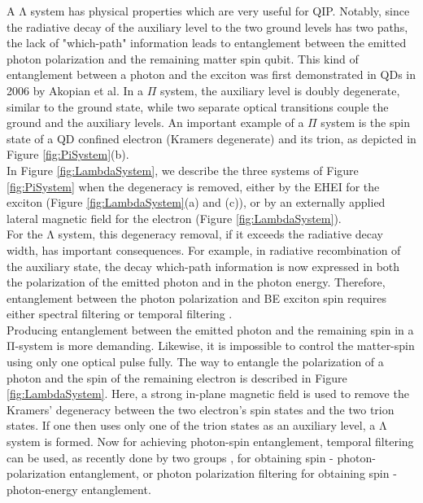 A Λ system has physical properties which are very useful for QIP. Notably, since the radiative decay of the auxiliary level to the two ground levels has two paths, the lack of "which-path" information leads to entanglement between the emitted photon polarization and the remaining matter spin qubit. This kind of entanglement between a photon and the exciton was first demonstrated in QDs in 2006 by Akopian et al. \cite{Akopian2006}
In a $\Pi$ system, the auxiliary level is doubly degenerate, similar to the ground state, while two separate optical transitions couple the ground and the auxiliary levels. An important example of a $\Pi$ system is the spin state of a QD confined electron (Kramers degenerate) and its trion, as depicted in Figure \ref{fig:PiSystem}(b).\\
In Figure \ref{fig:LambdaSystem}, we describe the three systems of Figure \ref{fig:PiSystem} when the degeneracy is removed, either by the EHEI for the exciton (Figure \ref{fig:LambdaSystem}(a) and
(c)), or by an externally applied lateral magnetic field for the electron (Figure \ref{fig:LambdaSystem}).\\
For the Λ system, this degeneracy removal, if it exceeds the radiative decay width, has important consequences. For example, in radiative recombination of the auxiliary state, the decay  which-path information is now expressed in both the polarization of the emitted photon and in the photon energy. Therefore, entanglement between the photon polarization and BE exciton spin requires either spectral filtering \cite{Hafenbrak2007} or temporal filtering \cite{Akopian2006}.\\
Producing entanglement between the emitted photon and the remaining spin in a Π-system is more demanding. Likewise, it is impossible to control the matter-spin using only one optical pulse fully. The way to entangle the polarization of a photon and the spin of the remaining electron is described in Figure \ref{fig:LambdaSystem}. Here, a strong in-plane magnetic field is used to remove the Kramers' degeneracy between the two electron's spin states and the two trion states. If one then uses only one of the trion states as an auxiliary level, a Λ system is formed. Now for achieving photon-spin entanglement, temporal filtering can be used, as recently done by two groups \cite{DeGreve2012} \cite{Schaibley2013}, for obtaining spin - photon-polarization entanglement, or photon polarization filtering \cite{Gao2012} for obtaining spin - photon-energy entanglement.
